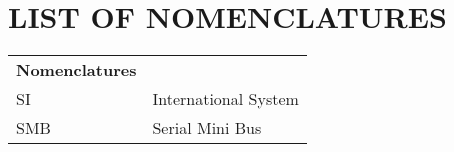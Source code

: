 \chapter{LIST OF NOMENCLATURES}

\par\noindent
\vspace{2cm}
\begin{tabular}{@{}p{30mm}l@{}}
\textbf{Nomenclatures}      & \\
SI                          & International System\\
SMB                         & Serial Mini Bus\\
\end{tabular}

